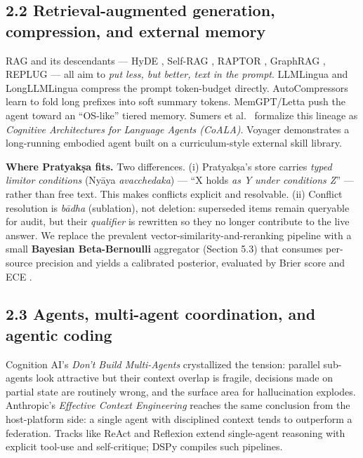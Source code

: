 \subsection{2.2 Retrieval-augmented generation, compression, and external memory}\label{retrieval-augmented-generation-compression-and-external-memory}

RAG \citep{lewis2020rag} and its descendants --- HyDE \citep{gao2023hyde}, Self-RAG \citep{asai2024selfrag}, RAPTOR \citep{sarthi2024raptor}, GraphRAG \citep{edge2024graphrag}, REPLUG \citep{shi2023less} --- all aim to \emph{put less, but better, text in the prompt}. LLMLingua \citep{jiang2023llmlingua} and LongLLMLingua \citep{jiang2024longllmlingua} compress the prompt token-budget directly. AutoCompressors \citep{chevalier2023autocompressors} learn to fold long prefixes into soft summary tokens. MemGPT/Letta \citep{packer2023memgpt} push the agent toward an ``OS-like'' tiered memory. Sumers et al.~\citeyearpar{sumers2024coala} formalize this lineage as \emph{Cognitive Architectures for Language Agents (CoALA)}. Voyager \citep{wang2024voyager} demonstrates a long-running embodied agent built on a curriculum-style external skill library.

\textbf{Where Pratyakṣa fits.} Two differences. (i) Pratyakṣa's store carries \emph{typed limitor conditions} (Nyāya \emph{avacchedaka}) --- ``X holds \emph{as Y} \emph{under conditions Z}'' --- rather than free text. This makes conflicts explicit and resolvable. (ii) Conflict resolution is \emph{bādha} (sublation), not deletion: superseded items remain queryable for audit, but their \emph{qualifier} is rewritten so they no longer contribute to the live answer. We replace the prevalent vector-similarity-and-reranking pipeline with a small \textbf{Bayesian Beta-Bernoulli} aggregator (Section 5.3) that consumes per-source precision and yields a calibrated posterior, evaluated by Brier score and ECE \citep{naeini2015ece, brier1950score, guo2017calibration}.

\subsection{2.3 Agents, multi-agent coordination, and agentic coding}\label{agents-multi-agent-coordination-and-agentic-coding}

Cognition AI's \emph{Don't Build Multi-Agents} \citep{yan2025dontbuild} crystallized the tension: parallel sub-agents look attractive but their context overlap is fragile, decisions made on partial state are routinely wrong, and the surface area for hallucination explodes. Anthropic's \emph{Effective Context Engineering} \citep{anthropic2025contexteng} reaches the same conclusion from the host-platform side: a single agent with disciplined context tends to outperform a federation. Tracks like ReAct \citep{yao2023react} and Reflexion \citep{shinn2023reflexion} extend single-agent reasoning with explicit tool-use and self-critique; DSPy \citep{khattab2023dspy} compiles such pipelines.


